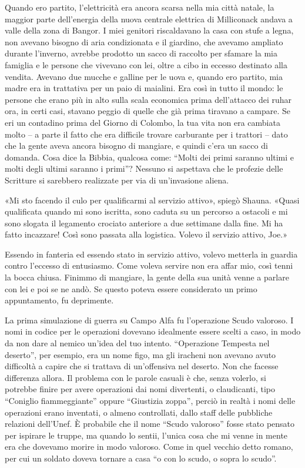 Quando ero partito, l'elettricità era ancora scarsa nella mia città
natale, la maggior parte dell'energia della nuova centrale elettrica di
Milliconack andava a valle della zona di Bangor. I miei genitori
riscaldavano la casa con stufe a legna, non avevano bisogno di aria
condizionata e il giardino, che avevamo ampliato durante l'inverno,
avrebbe prodotto un sacco di raccolto per sfamare la mia famiglia e le
persone che vivevano con lei, oltre a cibo in eccesso destinato alla
vendita. Avevano due mucche e galline per le uova e, quando ero partito,
mia madre era in trattativa per un paio di maialini. Era così in tutto
il mondo: le persone che erano più in alto sulla scala economica prima
dell'attacco dei ruhar ora, in certi casi, stavano peggio di quelle che
già prima tiravano a campare. Se eri un contadino prima del Giorno di
Colombo, la tua vita non era cambiata molto -- a parte il fatto che era
difficile trovare carburante per i trattori -- dato che la gente aveva
ancora bisogno di mangiare, e quindi c'era un sacco di domanda. Cosa
dice la Bibbia, qualcosa come: ``Molti dei primi saranno ultimi e molti
degli ultimi saranno i primi''? Nessuno si aspettava che le profezie
delle Scritture si sarebbero realizzate per via di un'invasione aliena.

«Mi sto facendo il culo per qualificarmi al servizio attivo», spiegò
Shauna. «Quasi qualificata quando mi sono iscritta, sono caduta su un
percorso a ostacoli e mi sono slogata il legamento crociato anteriore a
due settimane dalla fine. Mi ha fatto incazzare! Così sono passata alla
logistica. Volevo il servizio attivo, Joe.»

Essendo in fanteria ed essendo stato in servizio attivo, volevo metterla
in guardia contro l'eccesso di entusiasmo. Come voleva servire non era
affar mio, così tenni la bocca chiusa. Finimmo di mangiare, la gente
della sua unità venne a parlare con lei e poi se ne andò. Se questo
poteva essere considerato un primo appuntamento, fu deprimente.

\hfill\break

La prima simulazione di guerra su Campo Alfa fu l'operazione Scudo
valoroso. I nomi in codice per le operazioni dovevano idealmente essere
scelti a caso, in modo da non dare al nemico un'idea del tuo intento.
``Operazione Tempesta nel deserto'', per esempio, era un nome figo, ma
gli iracheni non avevano avuto difficoltà a capire che si trattava di
un'offensiva nel deserto. Non che facesse differenza allora. Il problema
con le parole casuali è che, senza volerlo, si potrebbe finire per avere
operazioni dai nomi divertenti, o claudicanti, tipo ``Coniglio
fiammeggiante'' oppure ``Giustizia zoppa'', perciò in realtà i nomi
delle operazioni erano inventati, o almeno controllati, dallo staff
delle pubbliche relazioni dell'Unef. È probabile che il nome ``Scudo
valoroso'' fosse stato pensato per ispirare le truppe, ma quando lo
sentii, l'unica cosa che mi venne in mente era che dovevamo morire in
modo valoroso. Come in quel vecchio detto romano, per cui un soldato
doveva tornare a casa ``o con lo scudo, o sopra lo scudo''.

